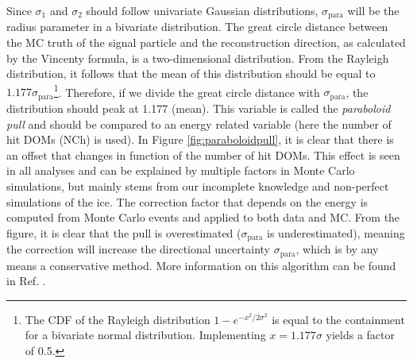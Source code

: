 \noindent Since $\sigma_1$ and $\sigma_2$ should follow univariate Gaussian distributions, $\sigma_\textrm{para}$ will be the radius parameter in a bivariate distribution. The great circle distance between the MC truth of the signal particle and the reconstruction direction, as calculated by the Vincenty formula, is a two-dimensional distribution. From the Rayleigh distribution, it follows that the mean of this distribution should be equal to $1.177\sigma_\textrm{para}$\footnote{The CDF of the Rayleigh distribution $1-e^{-x^2/2\sigma^2}$ is equal to the containment for a bivariate normal distribution. Implementing $x=1.177\sigma$ yields a factor of 0.5.}. Therefore, if we divide the great circle distance with $\sigma_\textrm{para}$, the distribution should peak at 1.177 (mean). This variable is called the \textit{paraboloid pull} and should be compared to an energy related variable (here the number of hit DOMs (NCh) is used). In Figure \ref{fig:paraboloidpull}, it is clear that there is an offset that changes in function of the number of hit DOMs. This effect is seen in all analyses and can be explained by multiple factors in Monte Carlo simulations, but mainly stems from our incomplete knowledge and non-perfect simulations of the ice. The correction factor that depends on the energy is computed from Monte Carlo events and applied to both data and MC. From the figure, it is clear that the pull is overestimated ($\sigma_\textrm{para}$ is underestimated), meaning the correction will increase the directional uncertainty $\sigma_\textrm{para}$, which is by any means a conservative method.
More information on this algorithm can be found in Ref. \cite{Neunhoffer:2004ha}.




